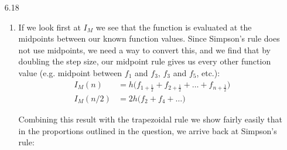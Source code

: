 \documentclass[11pt,a4paper]{article}
\begin{document}
\begin{itemize}
\begin{enumerate} [label={\alph*)}]
\begin{center}
					\end{center}	
					\item For each value of $n$, the computed value of $y(t)$ was:
					$$\begin{array}{c|c|c}
						n & computed & difference \\ \hline
						10 & 0.69359564141 & 3.3727e-02\\
						20 & 0.56714220363 & 1.6018e-01\\
						40 & 0.70120254590 & 2.6120e-02				
					\end{array}$$
					In order to for our error to be less than 10e-8 we solve for n using the trapezoidal error. We also use Matlab to calculate $\vert \vert_\infty \leq 10^{-8}$ as :
					\begin{align*}
						\vert f'' \vert \vert_\infty \approx 1.147687e+04
					\end{align*}
					Which allows us to solve for $n$ as follows:
					\begin{align*}
						\frac{3}{12}h*2\vert \vert f'' \vert \vert_\infty &\leq 10^-8 \\
						h &\leq \sqrt{\frac{10^{-8}}{11477}*4} \quad where \quad h=\frac{3}{n} \\
						n &\geq \frac{3}{\sqrt{\frac{10^{-8}}{11477}*4}} \\
						n &\geq 160,696
					\end{align*}
				\end{enumerate}
			
			\item[6.18]
				\begin{enumerate} [label={\alph*)}]
					\item If we look first at $I_M$ we see that the function is evaluated at the midpoints between our known function values. Since Simpson's rule does not use midpoints, we need a way to convert this, and we find that by doubling the step size, our midpoint rule gives us every other function value (e.g. midpoint between $f_1$ and $f_3$, $f_3$ and $f_5$, etc.):
					\begin{align*}
						I_M(n) &= h\Big(f_{1+\frac{1}{2}} + f_{2+\frac{1}{2}}+\dots+f_{n+\frac{1}{2}}\Big) \\
						I_M(n/2) &= 2h\Big(f_2 + f_4+\dots\Big)
					\end{align*}
					
					Combining this result with the trapezoidal rule we show fairly easily that in the proportions outlined in the question, we arrive back at Simpson's rule:
					

\end{enumerate}
\end{itemize}
\end{document}
